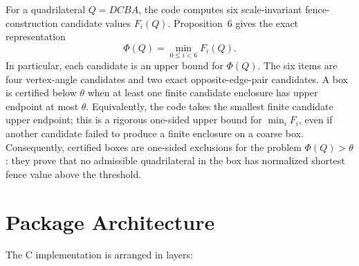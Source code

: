 \documentclass[11pt]{article}
\begin{document}
For a quadrilateral \(Q=DCBA\), the code computes six scale-invariant
fence-construction candidate values \(F_i(Q)\).  Proposition~6 gives the exact
representation
\[
  \Phi(Q) = \min_{0\le i<6} F_i(Q).
\]
In particular, each candidate is an upper bound for \(\Phi(Q)\).
The six items are four vertex-angle candidates and two exact opposite-edge-pair
candidates.  A box is certified below \(\theta\) when at least one finite
candidate enclosure has upper endpoint at most \(\theta\).  Equivalently, the
code takes the smallest finite candidate upper endpoint; this is a rigorous
one-sided upper bound for \(\min_i F_i\), even if another candidate failed to
produce a finite enclosure on a coarse box.
Consequently, certified boxes are one-sided exclusions for the problem
\(\Phi(Q)>\theta\): they prove that no admissible quadrilateral in the box has
normalized shortest fence value above the threshold.

\section{Package Architecture}

The C implementation is arranged in layers:
\end{document}
